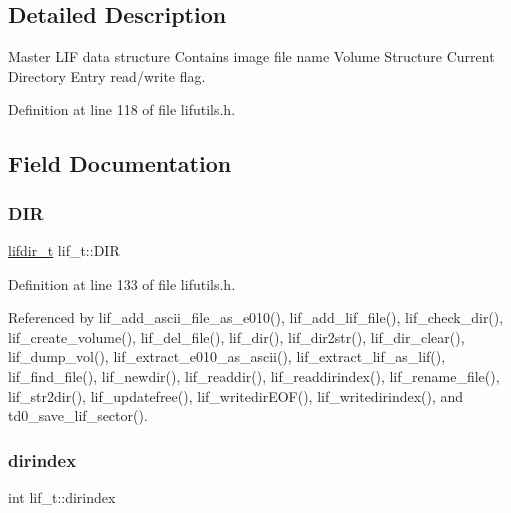 \subsection{Detailed Description}
Master L\+IF data structure Contains image file name Volume Structure Current Directory Entry read/write flag. 

Definition at line 118 of file lifutils.\+h.



\subsection{Field Documentation}
\mbox{\label{structlif__t_aefeaa526c04a2b8715b0392feeec52a3}} 
\subsubsection{\texorpdfstring{D\+IR}{DIR}}
{\footnotesize\ttfamily \hyperlink{structlifdir__t}{lifdir\+\_\+t} lif\+\_\+t\+::\+D\+IR}



Definition at line 133 of file lifutils.\+h.



Referenced by lif\+\_\+add\+\_\+ascii\+\_\+file\+\_\+as\+\_\+e010(), lif\+\_\+add\+\_\+lif\+\_\+file(), lif\+\_\+check\+\_\+dir(), lif\+\_\+create\+\_\+volume(), lif\+\_\+del\+\_\+file(), lif\+\_\+dir(), lif\+\_\+dir2str(), lif\+\_\+dir\+\_\+clear(), lif\+\_\+dump\+\_\+vol(), lif\+\_\+extract\+\_\+e010\+\_\+as\+\_\+ascii(), lif\+\_\+extract\+\_\+lif\+\_\+as\+\_\+lif(), lif\+\_\+find\+\_\+file(), lif\+\_\+newdir(), lif\+\_\+readdir(), lif\+\_\+readdirindex(), lif\+\_\+rename\+\_\+file(), lif\+\_\+str2dir(), lif\+\_\+updatefree(), lif\+\_\+writedir\+E\+O\+F(), lif\+\_\+writedirindex(), and td0\+\_\+save\+\_\+lif\+\_\+sector().

\mbox{\label{structlif__t_a74f8af3dc203c3c6b9dea3829bb4b6fa}} 
\subsubsection{\texorpdfstring{dirindex}{dirindex}}
{\footnotesize\ttfamily int lif\+\_\+t\+::dirindex}



